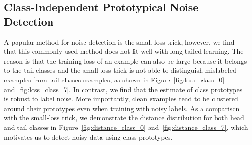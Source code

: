 \documentclass{article}
\begin{document}
\subsection{Class-Independent Prototypical Noise Detection}
A popular method for noise detection is the small-loss trick, however, we find that this commonly used method does not fit well with long-tailed learning. The reason is that the training loss of an example can also be large because it belongs to the tail classes and the small-loss trick is not able to distinguish mislabeled examples from tail classes examples, as shown in Figure~\ref{fig:loss_class_0} and~\ref{fig:loss_class_7}. 
In contrast, we find that the estimate of class prototypes is robust to label noise. More importantly, clean examples tend to be clustered around their prototypes even when training with noisy labels. As a comparison with the small-loss trick, we demonstrate the distance distribution for both head and tail classes in Figure~\ref{fig:distance_class_0} and~\ref{fig:distance_class_7}, which motivates us to detect noisy data using class prototypes. 
\end{document}
